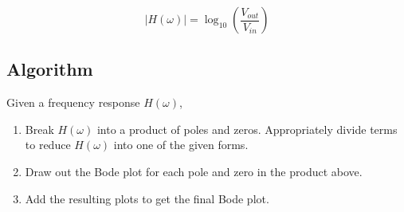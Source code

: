 \[
|H(\omega)|  =  \log_{10}\left({\frac{V_{out}}{V_{in}}}  \right)
\]

\subsection{Algorithm}
Given a frequency response $H(\omega)$,
\begin{enumerate}
\item
  Break $H(\omega)$ into a product of poles and zeros.
  Appropriately divide terms to reduce $H(\omega)$ into one of the given forms. 
\item
  Draw out the Bode plot for each pole and zero in the product above.
\item
  Add the resulting plots to get the final Bode plot.
\end{enumerate}

